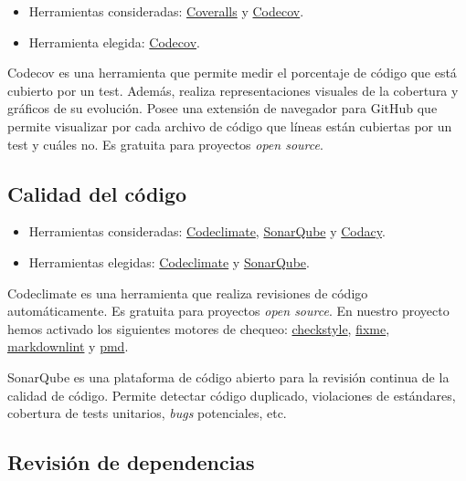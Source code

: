 \begin{itemize}
\tightlist
\item
  Herramientas consideradas: \href{https://coveralls.io/}{Coveralls} y
  \href{https://codecov.io/}{Codecov}.
\item
  Herramienta elegida: \href{https://codecov.io/}{Codecov}.
\end{itemize}

Codecov es una herramienta que permite medir el porcentaje de código que
está cubierto por un test. Además, realiza representaciones visuales de
la cobertura y gráficos de su evolución. Posee una extensión de
navegador para GitHub que permite visualizar por cada archivo de código
que líneas están cubiertas por un test y cuáles no. Es gratuita para
proyectos \emph{open source}.

\subsection{Calidad del código}\label{calidad-del-codigo}

\begin{itemize}
\tightlist
\item
  Herramientas consideradas:
  \href{https://codeclimate.com/}{Codeclimate},
  \href{https://sonarqube.com/}{SonarQube} y
  \href{https://www.codacy.com/}{Codacy}.
\item
  Herramientas elegidas: \href{https://codeclimate.com/}{Codeclimate} y
  \href{https://sonarqube.com/}{SonarQube}.
\end{itemize}

Codeclimate es una herramienta que realiza revisiones de código
automáticamente. Es gratuita para proyectos \emph{open source}. En
nuestro proyecto hemos activado los siguientes motores de chequeo:
\href{https://docs.codeclimate.com/docs/checkstyle}{checkstyle},
\href{https://docs.codeclimate.com/docs/fixme}{fixme},
\href{https://docs.codeclimate.com/docs/markdownlint}{markdownlint} y
\href{https://docs.codeclimate.com/docs/pmd}{pmd}.

SonarQube es una plataforma de código abierto para la revisión continua
de la calidad de código. Permite detectar código duplicado, violaciones
de estándares, cobertura de tests unitarios, \emph{bugs} potenciales,
etc.

\subsection{Revisión de dependencias}\label{revision-de-dependencias}

